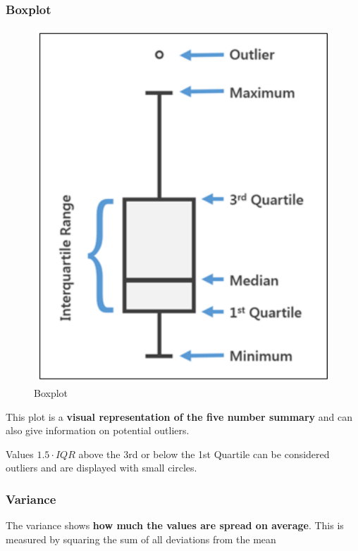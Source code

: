 \documentclass[a4paper, 11pt]{article}
\begin{document}
\subsubsection{Boxplot}

\begin{figure}
    \centering
    \includegraphics[keepaspectratio=true,height=14\baselineskip]{boxplot.png}
    \caption{Boxplot}
    \label{fig:boxplot}
\end{figure}

This plot is a \textbf{visual representation of the five number summary} and can also give information on potential outliers. 

Values $1.5 \cdot IQR$ above the 3rd or below the 1st Quartile can be considered outliers and are displayed with small circles. 

\subsubsection{Variance}
The variance shows \textbf{how much the values are spread on average}. This is measured by squaring the sum of all deviations from the mean
\end{document}
